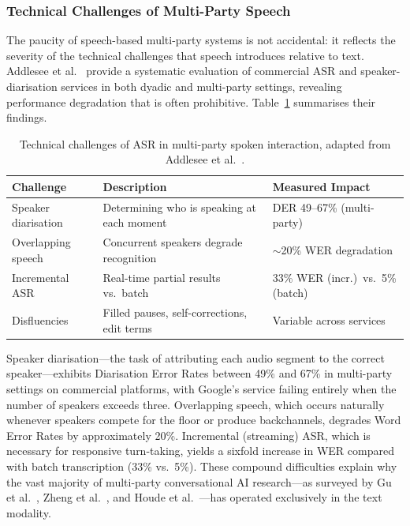 \subsubsection{Technical Challenges of Multi-Party Speech}
\label{sssec:multiparty-technical}

The paucity of speech-based multi-party systems is not accidental: it reflects
the severity of the technical challenges that speech introduces relative to
text.  Addlesee et al.~\cite{addlesee2020asr} provide a systematic evaluation
of commercial ASR and speaker-diarisation services in both dyadic and
multi-party settings, revealing performance degradation that is often
prohibitive.  Table~\ref{tab:asr-challenges} summarises their findings.

\begin{table}[ht]
  \centering
  \caption{Technical challenges of ASR in multi-party spoken interaction,
    adapted from Addlesee et al.~\cite{addlesee2020asr}.}
  \label{tab:asr-challenges}
  \small
  \begin{tabularx}{\textwidth}{@{} l X l @{}}
    \toprule
    \textbf{Challenge} & \textbf{Description} & \textbf{Measured Impact} \\
    \midrule
    Speaker diarisation
      & Determining who is speaking at each moment
      & DER 49--67\% (multi-party) \\
    Overlapping speech
      & Concurrent speakers degrade recognition
      & ${\sim}$20\% WER degradation \\
    Incremental ASR
      & Real-time partial results vs.\ batch
      & 33\% WER (incr.)\ vs.\ 5\% (batch) \\
    Disfluencies
      & Filled pauses, self-corrections, edit terms
      & Variable across services \\
    \bottomrule
  \end{tabularx}
\end{table}

Speaker diarisation---the task of attributing each audio segment to the correct
speaker---exhibits Diarisation Error Rates between 49\% and 67\% in multi-party
settings on commercial platforms, with Google's service failing entirely when
the number of speakers exceeds three.  Overlapping speech, which occurs
naturally whenever speakers compete for the floor or produce backchannels,
degrades Word Error Rates by approximately 20\%.  Incremental (streaming) ASR,
which is necessary for responsive turn-taking, yields a sixfold increase in WER
compared with batch transcription (33\% vs.\ 5\%).  These compound difficulties
explain why the vast majority of multi-party conversational AI research---as
surveyed by Gu et al.~\cite{gu2022mpc}, Zheng et
al.~\cite{zheng2022polyadic}, and Houde et al.~\cite{houde2025koala}---has
operated exclusively in the text modality.


